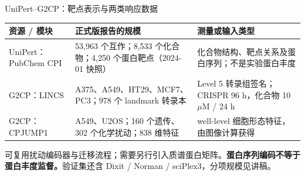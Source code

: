 \begin{frame}[t]{UniPert--G2CP：靶点表示与两类响应数据}
\bodyfont\renewcommand{\arraystretch}{1.22}
\begin{tabularx}{\textwidth}{@{}P{2.6cm}Y Y@{}}
\toprule
\textbf{资源 / 模块}&\textbf{正式版报告的规模}&\textbf{测量或输入类型}\\\midrule
UniPert：PubChem CPI & 53,963 个互作；8,533 个化合物；4,250 个蛋白靶点（2024-01 快照） & 化合物结构、靶点关系及蛋白序列；不是实验蛋白丰度\\
G2CP：LINCS & A375、A549、HT29、MCF7、PC3；978 个 landmark 转录本 & Level 5 转录组签名；CRISPR 96 h，化合物 10 $\mu$M / 24 h\\
G2CP：CPJUMP1 & A549、U2OS；160 个遗传、302 个化学扰动；838 维特征 & well-level 细胞形态特征，由图像计算获得\\
\bottomrule
\end{tabularx}
\vspace{.22cm}
可复用扰动编码器与迁移流程；需要另行引入质谱蛋白矩阵。\textbf{蛋白序列编码不等于蛋白丰度监督。}验证集还含 Dixit / Norman / sciPlex3，分项规模见讲稿。
\end{frame}
